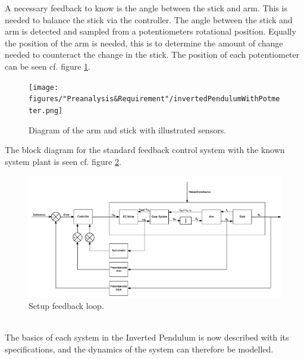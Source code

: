 A necessary feedback to know is the angle between the stick and arm. This is needed to balance the stick via the controller. The angle between the stick and arm is detected and sampled from a potentiometers rotational position. Equally the position of the arm is needed, this is to determine the amount of change needed to counteract the change in the stick. The position of each potentiometer can be seen cf. figure \ref{fig:InvertedPendulumSetUpPotmeter}. 

\begin{figure} [htbp]
	\centering
	\texttt{[image: figures/"Preanalysis\&Requirement"/invertedPendulumWithPotmeter.png]}
	\caption{Diagram of the arm and stick with illustrated sensors.} \label{fig:InvertedPendulumSetUpPotmeter}
\end{figure}
\newpage
The block diagram for the standard feedback control system with the known system plant is seen cf. figure \ref{fig:FeedbackSystem}. 

\begin{figure}[htbp]
\hspace*{-2.5 cm} 
	\centering
	\includegraphics[width=0.95\paperwidth]{figures/modeling/MechanicalSystem.png}
	\caption{Setup feedback loop.} \label{fig:FeedbackSystem}
\end{figure}
\\

The basics of each system in the Inverted Pendulum is now described with its specifications, and the dynamics of the system can therefore be modelled.


\newpage
